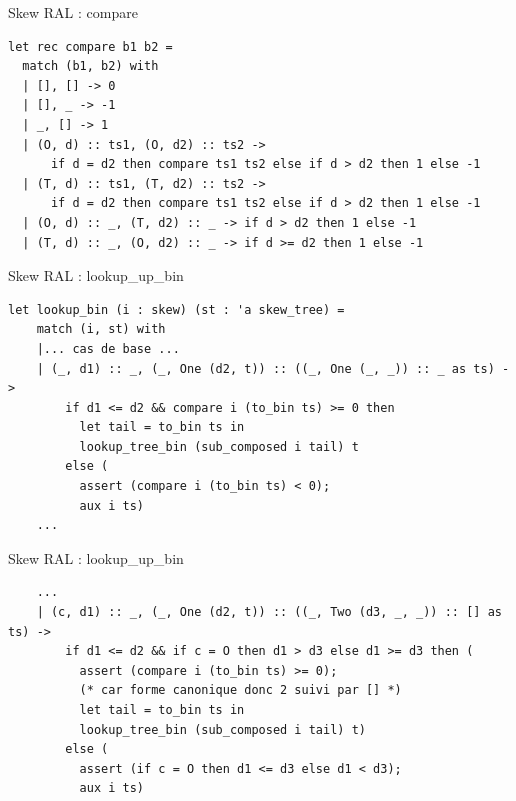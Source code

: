\documentclass{beamer}
\begin{document}
\begin{frame}[fragile]{Skew RAL : compare}
    \begin{lstlisting}
let rec compare b1 b2 =
  match (b1, b2) with
  | [], [] -> 0
  | [], _ -> -1
  | _, [] -> 1
  | (O, d) :: ts1, (O, d2) :: ts2 ->
      if d = d2 then compare ts1 ts2 else if d > d2 then 1 else -1
  | (T, d) :: ts1, (T, d2) :: ts2 ->
      if d = d2 then compare ts1 ts2 else if d > d2 then 1 else -1
  | (O, d) :: _, (T, d2) :: _ -> if d > d2 then 1 else -1
  | (T, d) :: _, (O, d2) :: _ -> if d >= d2 then 1 else -1
    \end{lstlisting}
\end{frame}

\begin{frame}[fragile]{Skew RAL : lookup\_up\_bin}
\begin{lstlisting}
let lookup_bin (i : skew) (st : 'a skew_tree) =
    match (i, st) with
    |... cas de base ...
    | (_, d1) :: _, (_, One (d2, t)) :: ((_, One (_, _)) :: _ as ts) ->
        if d1 <= d2 && compare i (to_bin ts) >= 0 then
          let tail = to_bin ts in
          lookup_tree_bin (sub_composed i tail) t
        else (
          assert (compare i (to_bin ts) < 0);
          aux i ts)
    ...
\end{lstlisting}
    
\end{frame}


    \begin{frame}[fragile]{Skew RAL : lookup\_up\_bin}
\begin{lstlisting}
    ...
    | (c, d1) :: _, (_, One (d2, t)) :: ((_, Two (d3, _, _)) :: [] as ts) ->
        if d1 <= d2 && if c = O then d1 > d3 else d1 >= d3 then (
          assert (compare i (to_bin ts) >= 0);
          (* car forme canonique donc 2 suivi par [] *)
          let tail = to_bin ts in
          lookup_tree_bin (sub_composed i tail) t)
        else (
          assert (if c = O then d1 <= d3 else d1 < d3);
          aux i ts)
\end{lstlisting}
    
\end{frame}
\end{document}
